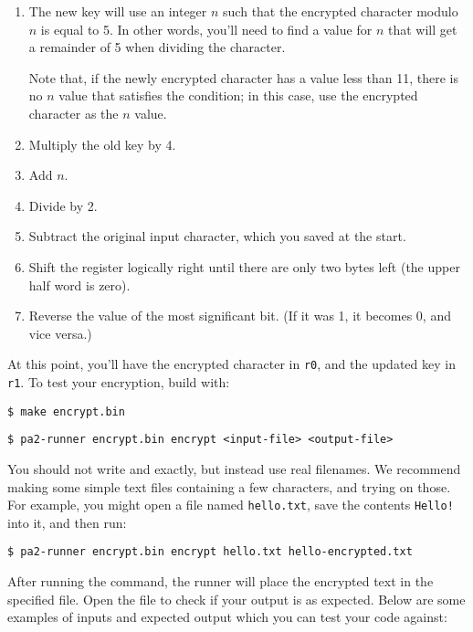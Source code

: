 \documentclass{article}
\def\r#1{\texttt{r#1}}
\begin{document}
\begin{enumerate} \item The new key will use an integer $n$ such that the 
encrypted character modulo $n$ is equal to 5. In other words, you'll need 
to find a value for $n$ that will get a remainder of 5 when dividing the
character.

Note that, if the newly encrypted character has a value less than 11, there
is no $n$ value that satisfies the condition; in this case, use the encrypted
character as the $n$ value.
\item Multiply the old key by 4.
\item Add $n$.
\item Divide by 2.
\item Subtract the original input character, which you saved at the start.
\item Shift the register logically right until there are only two bytes left
(the upper half word is zero).
\item Reverse the value of the most significant bit. (If it was 1, it becomes 
0, and vice versa.)
\end{enumerate}

At this point, you'll have the encrypted character in \r{0}, and the updated
key in \r{1}. To test your encryption, build with:

\begin{verbatim}
$ make encrypt.bin
\end{verbatim}

\begin{verbatim}
$ pa2-runner encrypt.bin encrypt <input-file> <output-file>
\end{verbatim}

You should not write {\tt <input-file>} and {\tt <output-file>} exactly, but
instead use real filenames. We recommend making some simple text files
containing a few characters, and trying on those. For example, you might open a
file named {\tt hello.txt}, save the contents {\tt Hello!} into it, and then
run:

\begin{verbatim}
$ pa2-runner encrypt.bin encrypt hello.txt hello-encrypted.txt
\end{verbatim}

After running the command, the runner will place the encrypted text in the
specified file. Open the file to check if your output is as expected.  Below
are some examples of inputs and expected output which you can test your code
against:
\end{document}
